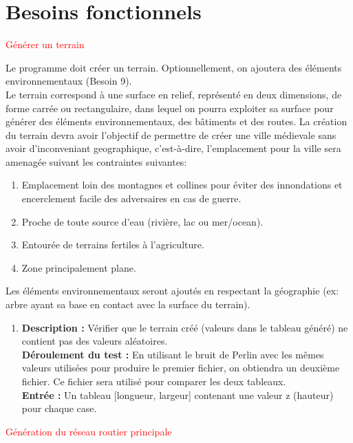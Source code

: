\section{Besoins fonctionnels}

\besoin{}
{\textcolor{red}{Générer un terrain}}
{
Le programme doit créer un terrain. Optionnellement, on ajoutera des éléments environnementaux (Besoin 9). \\
Le terrain correspond à une surface en relief, représenté en deux dimensions, de forme carrée ou rectangulaire, dans lequel on pourra exploiter sa surface pour générer des éléments environnementaux, des bâtiments et des routes.
La création du terrain devra avoir l'objectif de permettre de créer une ville médievale sans avoir d'inconveniant geographique, c'est-à-dire, l'emplacement pour la ville sera amenagée suivant les contraintes suivantes:

\begin{enumerate}
\item Emplacement loin des montagnes et collines pour éviter des innondations et encerclement facile des adversaires en cas de guerre.
\item Proche de toute source d'eau (rivière, lac ou mer/ocean).
\item Entourée de terrains fertiles à l'agriculture.
\item Zone principalement plane.
\end{enumerate}
 Les éléments environnementaux seront ajoutés en respectant la géographie (ex: arbre ayant sa base en contact avec la surface du terrain).
}
{}
{
\begin{enumerate}
\item \textbf{\tab Description : } Vérifier que le terrain créé (valeurs dans le tableau généré) ne contient pas des valeurs aléatoires.\\

\textbf{\tab Déroulement du test : } En utilisant le bruit de Perlin avec les mêmes valeurs utilisées pour produire le premier fichier, on obtiendra un deuxième fichier. Ce fichier sera utilisé pour comparer les deux  tableaux.\\
\textbf{\tab Entrée : } Un tableau [longueur, largeur] contenant une valeur z (hauteur) pour chaque case. 
\end{enumerate}
  
}
\newpage
\besoin{}
{\textcolor{red}{Génération du réseau routier principale}}
